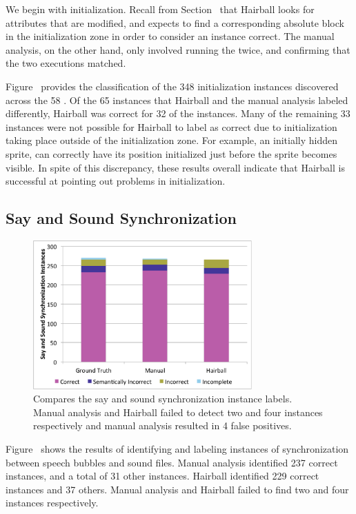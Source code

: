 We begin with initialization. Recall from Section~ that
Hairball looks for attributes that are modified, and expects to find a
corresponding absolute block in the initialization zone in order to consider an
instance correct. The manual analysis, on the other hand, only involved running
the \sprogram{} twice, and confirming that the two executions matched.

Figure~ provides the classification of the 348
initialization instances discovered across the 58 . Of the 65
instances that Hairball and the manual analysis labeled differently, Hairball
was correct for 32 of the instances. Many of the remaining 33 instances were
not possible for Hairball to label as correct due to initialization taking
place outside of the initialization zone. For example, an initially hidden
sprite, can correctly have its position initialized just before the sprite
becomes visible. In spite of this discrepancy, these results overall indicate
that Hairball is successful at pointing out problems in initialization.

\subsection{Say and Sound Synchronization}
\begin{figure}[!t]
\centering \includegraphics[trim=.3in .15in .3in .15in, clip,
  width=3.3in]{graphs/AutoSaySoundSync.eps}
\caption{Compares the say and sound synchronization instance labels. Manual
  analysis and Hairball failed to detect two and four instances respectively
  and manual analysis resulted in 4 false positives.}
\end{figure}


Figure~ shows the results of identifying and
labeling instances of synchronization between speech bubbles and sound
files. Manual analysis identified 237 correct instances, and a total of 31
other instances. Hairball identified 229 correct instances and 37
others. Manual analysis and Hairball failed to find two and four instances
respectively.

